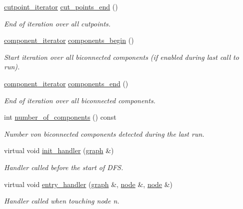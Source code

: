 \begin{DoxyCompactItemize}
\mbox{\hyperlink{classbiconnectivity_ac9063160d59ab0ea4fa924a68395700b}{cutpoint\+\_\+iterator}} \mbox{\hyperlink{classbiconnectivity_a78cb06c1d056b9519622a67a92e85b6e}{cut\+\_\+points\+\_\+end}} ()
\begin{DoxyCompactList}\small\item\em End of iteration over all cutpoints. \end{DoxyCompactList}\item 
\mbox{\hyperlink{classbiconnectivity_aef69aa0c23bfcd945e385350154b6483}{component\+\_\+iterator}} \mbox{\hyperlink{classbiconnectivity_ac0b7253533edc3f1412f771cb35bf04a}{components\+\_\+begin}} ()
\begin{DoxyCompactList}\small\item\em Start iteration over all biconnected components (if enabled during last call to run). \end{DoxyCompactList}\item 
\mbox{\hyperlink{classbiconnectivity_aef69aa0c23bfcd945e385350154b6483}{component\+\_\+iterator}} \mbox{\hyperlink{classbiconnectivity_a0bd1c70975e664174e591efd64f8dc71}{components\+\_\+end}} ()
\begin{DoxyCompactList}\small\item\em End of iteration over all biconnected components. \end{DoxyCompactList}\item 
int \mbox{\hyperlink{classbiconnectivity_ad77634a59ac6a08fae43c1c38540d5f0}{number\+\_\+of\+\_\+components}} () const
\begin{DoxyCompactList}\small\item\em Number von biconnected components detected during the last run. \end{DoxyCompactList}\item 
virtual void \mbox{\hyperlink{classbiconnectivity_a64adab869e0080e3a1f8479e70010317}{init\+\_\+handler}} (\mbox{\hyperlink{classgraph}{graph}} \&)
\begin{DoxyCompactList}\small\item\em Handler called before the start of D\+FS. \end{DoxyCompactList}\item 
virtual void \mbox{\hyperlink{classbiconnectivity_acb402f2d144f84429b3cd009121245b0}{entry\+\_\+handler}} (\mbox{\hyperlink{classgraph}{graph}} \&, \mbox{\hyperlink{classnode}{node}} \&, \mbox{\hyperlink{classnode}{node}} \&)
\begin{DoxyCompactList}\small\item\em Handler called when touching node {\itshape n}. \end{DoxyCompactList}\item 

\end{DoxyCompactItemize}
